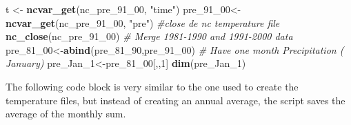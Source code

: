 \documentclass[
  10pt,
  b5paper,
]{book}
\newenvironment{Shaded}{\begin{snugshade}}{\end{snugshade}}
\newcommand{\CommentTok}[1]{\textcolor[rgb]{0.56,0.35,0.01}{\textit{#1}}}
\newcommand{\DecValTok}[1]{\textcolor[rgb]{0.00,0.00,0.81}{#1}}
\newcommand{\KeywordTok}[1]{\textcolor[rgb]{0.13,0.29,0.53}{\textbf{#1}}}
\newcommand{\NormalTok}[1]{#1}
\newcommand{\StringTok}[1]{\textcolor[rgb]{0.31,0.60,0.02}{#1}}
\begin{document}
\begin{Shaded}
\begin{Highlighting}[]
\NormalTok{t <-}\StringTok{ }\KeywordTok{ncvar_get}\NormalTok{(nc_pre_}\DecValTok{91}\NormalTok{_}\DecValTok{00}\NormalTok{, }\StringTok{"time"}\NormalTok{)}
\NormalTok{ pre_}\DecValTok{91}\NormalTok{_}\DecValTok{00}\NormalTok{<-}\KeywordTok{ncvar_get}\NormalTok{(nc_pre_}\DecValTok{91}\NormalTok{_}\DecValTok{00}\NormalTok{, }\StringTok{"pre"}\NormalTok{)}
 \CommentTok{#close de nc temperature file}
 \KeywordTok{nc_close}\NormalTok{(nc_pre_}\DecValTok{91}\NormalTok{_}\DecValTok{00}\NormalTok{) }
 \CommentTok{# Merge 1981-1990 and 1991-2000 data }
\NormalTok{ pre_}\DecValTok{81}\NormalTok{_}\DecValTok{00}\NormalTok{<-}\KeywordTok{abind}\NormalTok{(pre_}\DecValTok{81}\NormalTok{_}\DecValTok{90}\NormalTok{,pre_}\DecValTok{91}\NormalTok{_}\DecValTok{00}\NormalTok{)}
\CommentTok{# Have one month Precipitation ( January)}
\NormalTok{ pre_Jan_}\DecValTok{1}\NormalTok{<-pre_}\DecValTok{81}\NormalTok{_}\DecValTok{00}\NormalTok{[,,}\DecValTok{1}\NormalTok{]}
 \KeywordTok{dim}\NormalTok{(pre_Jan_}\DecValTok{1}\NormalTok{)}
\end{Highlighting}
\end{Shaded}

The following code block is very similar to the one used to create the temperature files, but instead of creating an annual average, the script saves the average of the monthly sum.
\end{document}
